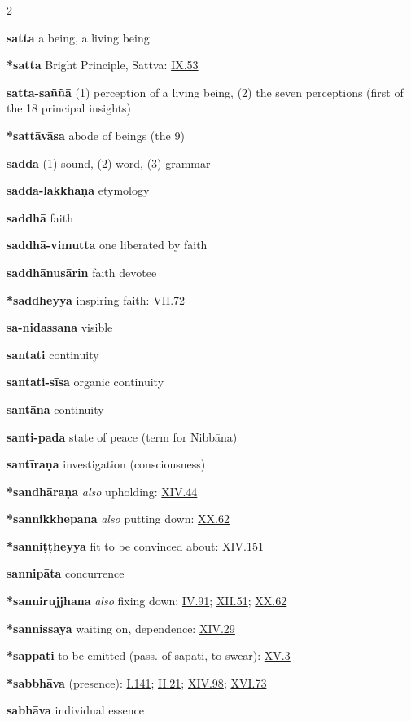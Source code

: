 \begin{multicols}{2}
\begin{vismHanging}
\par\textbf{satta} a being, a living being
\par\textbf{*satta} Bright Principle, Sattva: \hyperlink{IX.53}{IX.53}{}
\par\textbf{satta-saññā} (1) perception of a living being, (2) the seven perceptions (first of the 18 principal insights) 
\par\textbf{*sattāvāsa} abode of beings (the 9)
\par\textbf{sadda} (1) sound, (2) word, (3) grammar
\par\textbf{sadda-lakkhaṇa} etymology
\par\textbf{saddhā} faith
\par\textbf{saddhā-vimutta} one liberated by faith
\par\textbf{saddhānusārin} faith devotee
\par\textbf{*saddheyya} inspiring faith: \hyperlink{VII.72}{VII.72}{}
\par\textbf{sa-nidassana} visible
\par\textbf{santati} continuity
\par\textbf{santati-sīsa} organic continuity
\par\textbf{santāna} continuity
\par\textbf{santi-pada} state of peace (term for Nibbāna) 
\par\textbf{santīraṇa} investigation (consciousness)
\par\textbf{*sandhāraṇa} \emph{also }upholding: \hyperlink{XIV.44}{XIV.44}{}
\par\textbf{*sannikkhepana} \emph{also }putting down: \hyperlink{XX.62}{XX.62}{} 
\par\textbf{*sanniṭṭheyya} fit to be convinced about: \hyperlink{XIV.151}{XIV.151}{} 
\par\textbf{sannipāta} concurrence
\par\textbf{*sannirujjhana} \emph{also }fixing down: \hyperlink{IV.91}{IV.91}{}; \hyperlink{XII.51}{XII.51}{}; \hyperlink{XX.62}{XX.62}{} 
\par\textbf{*sannissaya} waiting on, dependence: \hyperlink{XIV.29}{XIV.29}{} 
\par\textbf{*sappati} to be emitted (pass. of sapati, to swear): \hyperlink{XV.3}{XV.3}{} 
\par\textbf{*sabbhāva} (presence): \hyperlink{I.141}{I.141}{}; \hyperlink{II.21}{II.21}{}; \hyperlink{XIV.98}{XIV.98}{}; \hyperlink{XVI.73}{XVI.73}{} 
\par\textbf{sabhāva} individual essence 

\end{vismHanging}
\end{multicols}
